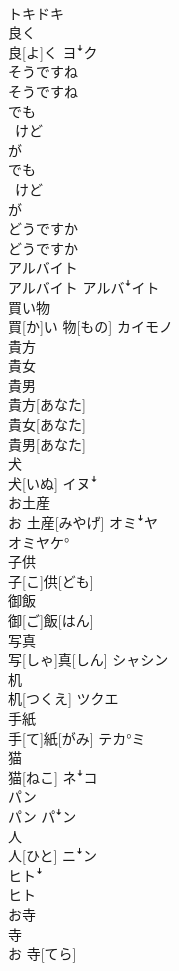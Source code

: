 \documentclass[8pt]{extreport}
\begin{document}
\begin{CJK}{UTF8}{min}
\\	トキドキ
\\	良く	
\\	良[よ]く	ヨꜜク
\\	そうですね	
\\	そうですね	
\\	でも 
\\	~けど 
\\	が	
\\	でも 
\\	~けど 
\\	が	
\\	どうですか	
\\	どうですか	
\\	アルバイト	
\\	アルバイト	アルバꜜイト
\\	買い物	
\\	買[か]い 物[もの]	カイモノ
\\	貴方 
\\	貴女 
\\	貴男	
\\	貴方[あなた] 
\\	貴女[あなた] 
\\	貴男[あなた]	
\\	犬	
\\	犬[いぬ]	イヌꜜ
\\	お土産	
\\	お 土産[みやげ]	オミꜜヤ 
\\	オミヤケ°
\\	子供	
\\	子[こ]供[ども]	
\\	御飯	
\\	御[ご]飯[はん]	
\\	写真	
\\	写[しゃ]真[しん]	シャシン
\\	机	
\\	机[つくえ]	ツクエ
\\	手紙	
\\	手[て]紙[がみ]	テカ°ミ
\\	猫	
\\	猫[ねこ]	ネꜜコ
\\	パン	
\\	パン	パꜜン
\\	人	
\\	人[ひと]	ニꜜン 
\\	ヒトꜜ 
\\	ヒト
\\	お寺 
\\	寺	
\\	お 寺[てら] 

\end{CJK}
\end{document}
